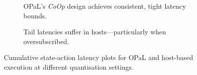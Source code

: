 \documentclass[
sigconf,natbib=false
,anonymous=true
]{acmart}
\newcommand{\approachshort}{OPaL}
\newcommand{\Coopfw}{\emph{CoOp}}
\begin{document}
\begin{figure}
	\centering
	\begin{subfigure}{0.45\linewidth}
		\caption{\approachshort's \Coopfw{} design achieves consistent, tight latency bounds.}
	\end{subfigure}
	\hspace{0.05\linewidth}
	\begin{subfigure}{0.45\linewidth}
		\caption{Tail latencies suffer in hosts---particularly when oversubscribed.}
	\end{subfigure}
	\caption{Cumulative state-action latency plots for \approachshort{} and host-based execution at different quantisation settings.\label{fig:lat-cumul}}
\end{figure}
\end{document}

